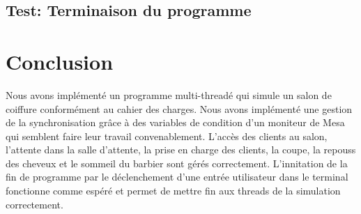 \documentclass{article}
\begin{document}
\subsection*{Test: Terminaison du programme}

\section*{Conclusion}

Nous avons implémenté un programme multi-threadé qui simule un salon de coiffure conformément au cahier des charges. Nous avons implémenté une
gestion de la synchronisation grâce à des variables de condition d'un moniteur de Mesa qui semblent faire leur travail convenablement. 
L'accès des clients au salon, l'attente dans la salle d'attente, la prise en charge des clients, la coupe, la repouss des cheveux et le 
sommeil du barbier sont gérés correctement.
L'innitation de la fin de programme par le déclenchement d'une entrée utilisateur dans le terminal fonctionne comme espéré et permet de 
mettre fin aux threads de la simulation correctement.
\end{document}
